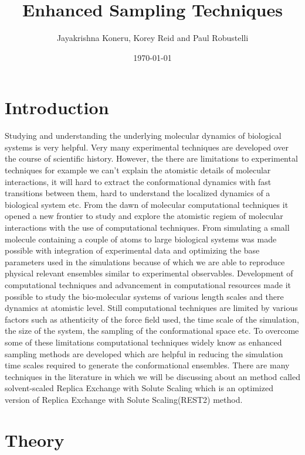 \documentclass{book}
\begin{document}
\title{Enhanced Sampling Techniques}
\author{Jayakrishna Koneru, Korey Reid and Paul Robustelli}
\date{\today}

\maketitle

\tableofcontents

\chapter{Introduction}
Studying and understanding the underlying molecular dynamics of biological systems is very helpful. Very many experimental techniques are developed over the course of scientific history.
However, the there are limitations to experimental techniques for example we can't explain the atomistic details of molecular interactions, it will hard to extract the conformational dynamics
with fast transitions between them, hard to understand the localized dynamics of a biological system etc. From the dawn of molecular computational techniques it opened a new frontier to study
and explore the atomistic regiem of molecular interactions with the use of computational techniques. From simulating a small molecule containing a couple of atoms to large biological systems 
was made possible with integration of experimental data and optimizing the base parameters used in the simulations because of which we are able to reproduce physical relevant ensembles similar 
to experimental observables. Development of computational techniques and advancement in computational 
resources made it possible to study the bio-molecular systems of various length scales and there dynamics at atomistic level. Still computational techniques are limited by various factors
such as athenticity of the force field used, the time scale of the simulation, the size of the system, the sampling of the conformational space etc. To overcome some of these limitations
computational techniques widely know as enhanced sampling methods are developed which are helpful in reducing the simulation time scales required to generate the conformational ensembles.
There are many techniques in the literature in which we will be discussing about an method called solvent-scaled Replica Exchange with Solute Scaling which is an optimized version of 
Replica Exchange with Solute Scaling(REST2) method.        
  
\chapter{Theory} 
\end{document}
